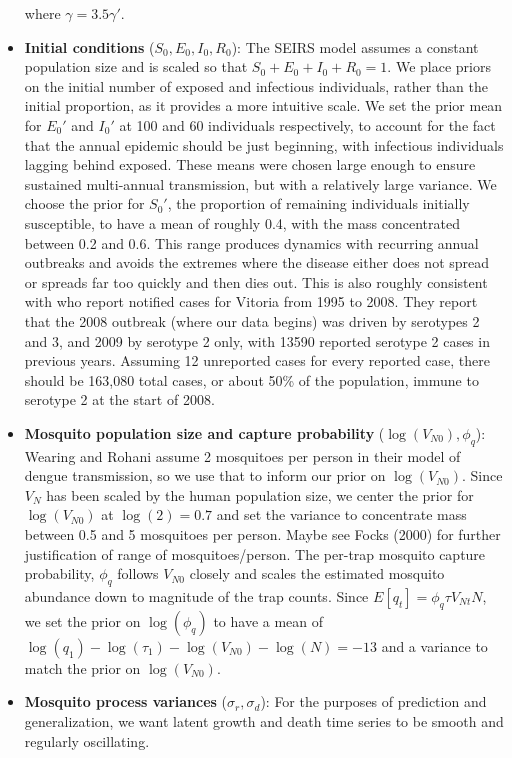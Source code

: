 \documentclass[12pt,letterpaper]{article}
\begin{document}
\begin{itemize}
where $\gamma = 3.5\gamma'$.
\\
\item \textbf{Initial conditions} ($S_0, E_0, I_0, R_0$): The SEIRS model assumes a constant population size and is scaled so that $S_0+E_0+I_0+R_0 = 1$.
We place priors on the initial number of exposed and infectious individuals, rather than the initial proportion, as it provides a more intuitive scale.
We set the prior mean for $E_0'$ and $I_0'$ at 100 and 60 individuals respectively, to account for the fact that the annual epidemic should be just beginning, with infectious individuals lagging behind exposed.
These means were chosen large enough to ensure sustained multi-annual transmission, but with a relatively large variance.
We choose the prior for $S_0'$, the proportion of remaining individuals initially susceptible, to have a mean of roughly  0.4, with the mass concentrated between 0.2 and 0.6.
This range produces dynamics with recurring annual outbreaks and avoids the extremes where the disease either does not spread or spreads far too quickly and then dies out.
This is also roughly consistent with \cite{Cardoso2011a} who report notified cases for Vitoria from 1995 to 2008. 
They report that the 2008 outbreak (where our data begins) was driven by serotypes 2 and 3, and 2009 by serotype 2 only, with 13590 reported serotype 2 cases in previous years.
Assuming 12 unreported cases for every reported case, there should be 163,080 total cases, or about 50\% of the population, immune to serotype 2 at the start of 2008.
\\
\item \textbf{Mosquito population size and capture probability} ($\log(V_{N0}), \phi_q$): Wearing and Rohani \cite{Wearing2006} assume 2 mosquitoes per person in their model of dengue transmission, so we use that to inform our prior on $\log(V_{N0})$.
Since $V_{N}$ has been scaled by the human population size, we center the prior for $\log(V_{N0})$ at $\log(2) = 0.7$ and set the variance to concentrate mass between 0.5 and 5 mosquitoes per person.
Maybe see Focks (2000) for further justification of range of mosquitoes/person.
The per-trap mosquito capture probability, $\phi_q$ follows $V_{N0}$ closely and scales the estimated mosquito abundance down to magnitude of the trap counts.
Since $ E[q_t] = \phi_q \tau V_{Nt} N$, we set the prior on $\log(\phi_q)$ to have a mean of $\log(q_1) - \log(\tau_1) - \log(V_{N0}) - \log(N) = -13$ and a variance to match the prior on $\log(V_{N0})$.
\\
\item \textbf{Mosquito process variances} ($\sigma_r, \sigma_d$): For the purposes of prediction and generalization, we want latent growth and death time series to be smooth and regularly oscillating.

\end{itemize}
\end{document}
